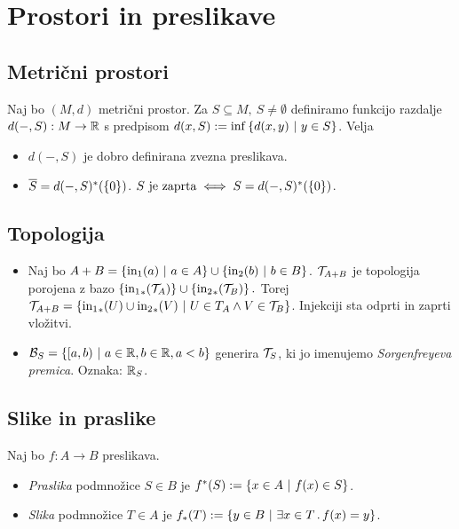 \section{Prostori in preslikave}
\subsection{Metrični prostori}

Naj bo $(M, d)$ metrični prostor. Za $S \subseteq M, \ S \neq \emptyset$ definiramo funkcijo razdalje $d(-, S): M \to \mathbb{R}$ s predpisom $d(x, S) := \inf \left\{d(x,y) \ | \ y \in S\right\}$. Velja
\begin{itemize}
    \item $d(-, S)$ je dobro definirana zvezna preslikava.
    \item $\overline{S} = d(-, S)^*(\left\{0\right\})$. $S \text{ je zaprta} \iff S = d(-, S)^*(\left\{0\right\})$.
\end{itemize}

\subsection{Topologija}
\begin{itemize}
    \item Naj bo $A+ B = \left\{\text{in}_1(a) \ | \ a \in A\right\} \cup \left\{\text{in}_2(b) \ | \ b \in B\right\}$. $\mathcal{T}_{A+B}$ je topologija porojena z bazo $\left\{{\text{in}_1}_{*}(\mathcal{T}_A)\right\} \cup \left\{{\text{in}_2}_{*}(\mathcal{T}_B)\right\}.$ Torej $\mathcal{T}_{A+B} = \left\{{\text{in}_1}_{*}(U) \cup {\text{in}_2}_{*}(V) \ | \ U \in T_A \land V \in \mathcal{T}_B\right\}$. Injekciji sta odprti in zaprti vložitvi.
    \item $\mathcal{B}_S = \left\{[a, b) \ | \ a \in \mathbb{R}, b \in \mathbb{R}, a < b\right\}$ generira $\mathcal{T}_S$, ki jo imenujemo \emph{Sorgenfreyeva premica}. Oznaka: $\mathbb{R}_S$.
\end{itemize}

\subsection{Slike in praslike}
\begin{definicija}
    Naj bo $f: A \to B$ preslikava.
    \begin{itemize}
        \item \emph{Praslika} podmnožice $S \in B$ je $f^*(S) := \left\{x \in A \ | \ f(x) \in S\right\}$.
        \item \emph{Slika} podmnožice $T \in A$ je $f_*(T) := \left\{y \in B \ | \ \exists x \in T \,.\, f(x) = y\right\}$.
    \end{itemize}
\end{definicija}

